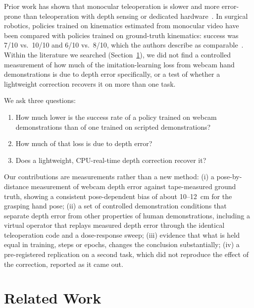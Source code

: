 \documentclass[10pt]{article}
\begin{document}
Prior work has shown that monocular teleoperation is slower and more error-prone than teleoperation with depth sensing or dedicated hardware~\citep{qin2023anyteleop,teleopbench2025}.
In surgical robotics, policies trained on kinematics estimated from monocular video have been compared with policies trained on ground-truth kinematics: success was 7/10 vs.\ 10/10 and 6/10 vs.\ 8/10, which the authors describe as comparable~\citep{chen2025surgipose}.
Within the literature we searched (Section~\ref{sec:related}), we did not find a controlled measurement of how much of the imitation-learning loss from webcam hand demonstrations is due to depth error specifically, or a test of whether a lightweight correction recovers it on more than one task.

We ask three questions:
\begin{enumerate}
\item How much lower is the success rate of a policy trained on webcam demonstrations than of one trained on scripted demonstrations?
\item How much of that loss is due to depth error?
\item Does a lightweight, CPU-real-time depth correction recover it?
\end{enumerate}

Our contributions are measurements rather than a new method:
(i) a pose-by-distance measurement of webcam depth error against tape-measured ground truth, showing a consistent pose-dependent bias of about 10--12~cm for the grasping hand pose;
(ii) a set of controlled demonstration conditions that separate depth error from other properties of human demonstrations, including a virtual operator that replays measured depth error through the identical teleoperation code and a dose-response sweep;
(iii) evidence that what is held equal in training, steps or epochs, changes the conclusion substantially;
(iv) a pre-registered replication on a second task, which did not reproduce the effect of the correction, reported as it came out.

\section{Related Work}
\label{sec:related}
\end{document}
